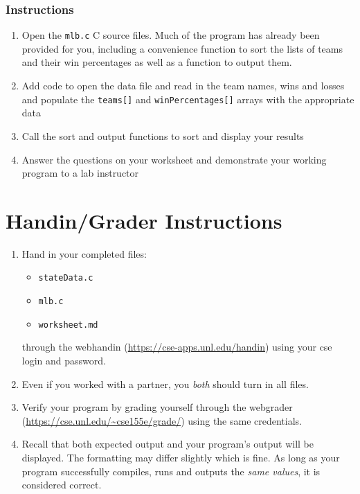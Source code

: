 \documentclass[12pt]{scrartcl}
\begin{document}
\subsubsection*{Instructions}

\begin{enumerate}
  \item Open the \texttt{mlb.c} C source files.  Much of the program 
  	has already been provided for you, including a convenience function to 
	sort the lists of teams and their win percentages as well as a function 
	to output them.
  \item Add code to open the data file and read in the team names, wins and 
	losses and populate the \texttt{teams[]} and \texttt{winPercentages[]} 
	arrays with the appropriate data
  \item Call the sort and output functions to sort and display your results
  \item Answer the questions on your worksheet and demonstrate your working 
  	program to a lab instructor
\end{enumerate}

\section{Handin/Grader Instructions}

\begin{enumerate}
  \item Hand in your completed files:
  \begin{itemize}
    \item \texttt{stateData.c}
    \item \texttt{mlb.c}
    \item \texttt{worksheet.md}
  \end{itemize}
  through the webhandin (\url{https://cse-apps.unl.edu/handin}) 
  using your cse login and password.  
  \item Even if you worked with a partner, you \emph{both} should
  turn in all files.
  \item Verify your program by grading yourself through the
  webgrader (\url{https://cse.unl.edu/~cse155e/grade/}) using the
  same credentials.
  \item Recall that both expected output and your program's output
  will be displayed.  The formatting may differ slightly which is fine.
  As long as your program successfully compiles, runs and outputs 
  the \emph{same values}, it is considered correct.
\end{enumerate}
\end{document}

